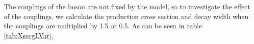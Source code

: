 The couplings of the \wprime boson are not fixed by the model, so to investigate the effect of the couplings, we calculate the production cross section and decay width when the couplings are multiplied by 1.5 or 0.5. As can be seen in table \ref{tab:XsecgLVar}, 
